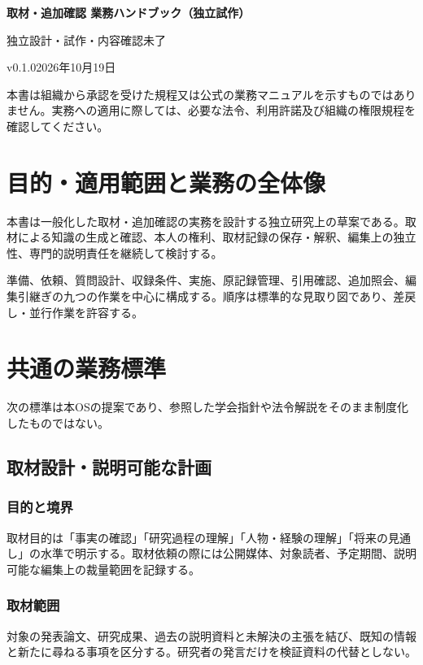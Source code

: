 \documentclass[a4paper,11pt]{article}
\begin{document}
\begin{center}
{\Large\bfseries 取材・追加確認 業務ハンドブック（独立試作）}\par\medskip
{\small 独立設計・試作・内容確認未了}\par
{\small v0.1.0\quad 2026年10月19日}\par
\end{center}
\vspace{6mm}
\noindent 本書は組織から承認を受けた規程又は公式の業務マニュアルを示すものではありません。実務への適用に際しては、必要な法令、利用許諾及び組織の権限規程を確認してください。\par
\tableofcontents
\clearpage
\section{目的・適用範囲と業務の全体像}
\par 本書は一般化した取材・追加確認の実務を設計する独立研究上の草案である。取材による知識の生成と確認、本人の権利、取材記録の保存・解釈、編集上の独立性、専門的説明責任を継続して検討する。\par\medskip
\par 準備、依頼、質問設計、収録条件、実施、原記録管理、引用確認、追加照会、編集引継ぎの九つの作業を中心に構成する。順序は標準的な見取り図であり、差戻し・並行作業を許容する。\par\medskip
\section{共通の業務標準}
\par 次の標準は本OSの提案であり、参照した学会指針や法令解説をそのまま制度化したものではない。\par\medskip
\subsection{取材設計・説明可能な計画}
\subsubsection{目的と境界}
\par 取材目的は「事実の確認」「研究過程の理解」「人物・経験の理解」「将来の見通し」の水準で明示する。取材依頼の際には公開媒体、対象読者、予定期間、説明可能な編集上の裁量範囲を記録する。\par\medskip
\subsubsection{取材範囲}
\par 対象の発表論文、研究成果、過去の説明資料と未解決の主張を結び、既知の情報と新たに尋ねる事項を区分する。研究者の発言だけを検証資料の代替としない。\par\medskip
\end{document}
